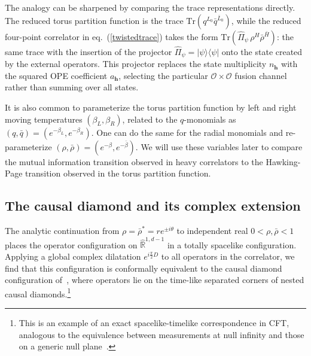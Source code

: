 \documentclass[a4paper,11pt]{article}
\theoremstyle{plain}
\theoremstyle{definition}
\theoremstyle{remark}
\newcommand{\bs}[1]{\boldsymbol{#1}}
\newcommand{\rhob}{{\bar{\rho}}}
\newcommand{\cO}{\mathcal O}
\begin{document}
The analogy can be sharpened by comparing the trace representations directly. The reduced torus partition function is the trace $\text{Tr}(q^{L_0} \bar{q}^{\bar{L}_0})$, while the reduced four-point correlator in eq.~(\ref{twistedtrace}) takes the form $\text{Tr}(\hat{\Pi}_\psi\, \rho^{H} \rhob^{\bar{H}})$: the same trace with the insertion of the projector $\hat{\Pi}_\psi = |\psi\rangle \langle \psi |$ onto the state created by the external operators. This projector replaces the state multiplicity $n_{\bs{h}}$ with the squared OPE coefficient $a_{\bs{h}}$, selecting the particular $\cO\times\cO$ fusion channel rather than summing over all states.
 
It is also common to parameterize the torus partition function by left and right moving temperatures $(\beta_L,\beta_R)$, related to the $q$-monomials as $(q,\bar{q}) = (e^{-\beta_L},e^{-\beta_R})$. One can do the same for the radial monomials and re-parameterize $(\rho,\bar{\rho}) = (e^{-\beta},e^{-\bar{\beta}})$. We will use these variables later to compare the mutual information transition observed in heavy correlators to the Hawking-Page transition observed in the torus partition function.

 
\subsection{The causal diamond and its complex extension}
\label{causaldiamond}
 
The analytic continuation from $\rho= \rhob^* = r e^{\pm i\theta}$ to independent real $0<\rho ,\bar{\rho} < 1$ places the operator configuration on $\widehat{\mathbb{R}}^{1,d-1}$ in a totally spacelike configuration. Applying a global complex dilatation $e^{i \frac{\pi}{2} D}$ to all operators in the correlator, we find that this configuration is conformally equivalent to the causal diamond configuration of~\cite{Ceyhan:2025qrj,Qiao:2020bcs}, where operators lie on the time-like separated corners of nested causal diamonds.\footnote{This is an example of an exact spacelike-timelike correspondence in CFT, analogous to the equivalence between measurements at null infinity and those on a generic null plane~\cite{Mueller:2018llt,Brunello:2025rhh}.}
\end{document}
